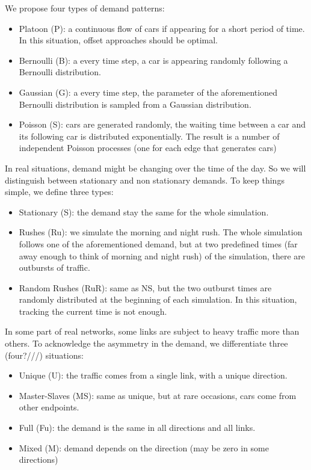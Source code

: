 \documentclass{article}
\begin{document}
        We propose four types of demand patterns:
    
        \begin{itemize}
            \item Platoon (P): a continuous flow of cars if appearing for a short period of time. In this situation, offset approaches should be optimal.
            \item Bernoulli (B): a every time step, a car is appearing randomly following a Bernoulli distribution.
            \item Gaussian (G): a every time step, the parameter of the aforementioned Bernoulli distribution is sampled from a Gaussian distribution.
            \item Poisson (S): cars are generated randomly, the waiting time between a car and its following car is distributed exponentially. The result is a number of independent Poisson processes (one for each edge that generates cars)
        \end{itemize}
        
        In real situations, demand might be changing over the time of the day. So we will distinguish between stationary and non stationary demands. To keep things simple, we define three types:
        
        \begin{itemize}
            \item Stationary (S): the demand stay the same for the whole simulation.
            \item Rushes (Ru): we simulate the morning and night rush. The whole simulation follows one of the aforementioned demand, but at two predefined times (far away enough to think of morning and night rush) of the simulation, there are outbursts of traffic.
            \item Random Rushes (RuR): same as NS, but the two outburst times are randomly distributed at the beginning of each simulation. In this situation, tracking the current time is not enough.
        \end{itemize}
        
        In some part of real networks, some links are subject to heavy traffic more than others. To acknowledge the asymmetry in the demand, we differentiate three (four?///) situations:
        
        \begin{itemize}
            \item Unique (U): the traffic comes from a single link, with a unique direction.
            \item Master-Slaves (MS): same as unique, but at rare occasions, cars come from other endpoints.
            \item Full (Fu): the demand is the same in all directions and all links.
            \item Mixed (M): demand depends on the direction (may be zero in some directions)
        \end{itemize}
\end{document}
